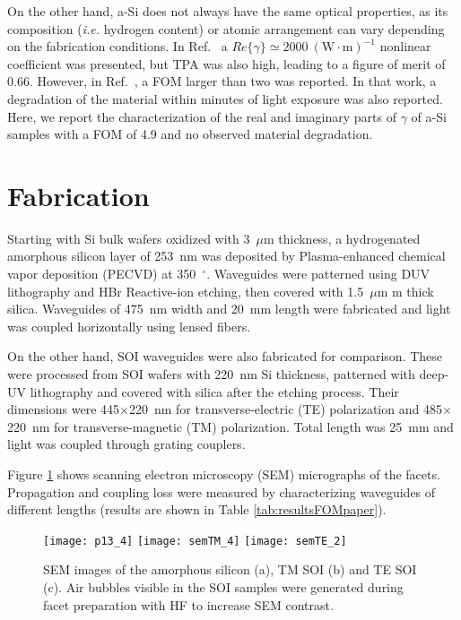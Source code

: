 On the other hand, a-Si does not always have the same optical properties, as its composition (\emph{i.e.} hydrogen content) or atomic arrangement can vary depending on the fabrication conditions.
In Ref.~\cite{Narayanan2010} a $Re\{\gamma\} \simeq 2000~(\mathrm{W}\cdot\mathrm{m})^{-1}$ nonlinear coefficient was presented, but TPA was also high, leading to a figure of merit of 0.66. However, in Ref.~\cite{Kuyken2011}, a FOM larger than two was reported. In that work, a degradation of the material within minutes of light exposure was also reported.
Here, we report the characterization of the real and imaginary parts of $\gamma$ of a-Si samples with a FOM of 4.9 and no observed material degradation.


\section{Fabrication}
Starting with Si bulk wafers oxidized with 3~$\mu \mathrm{m}$ thickness, a hydrogenated amorphous silicon layer of 253~nm was deposited by Plasma-enhanced chemical vapor deposition (PECVD) at 350~$^\circ$. Waveguides were patterned using DUV lithography and HBr Reactive-ion etching, then covered with 1.5~$\mu \mathrm{m}$ m thick silica. Waveguides of 475~nm width and 20~mm length were fabricated and light was coupled horizontally using lensed fibers.

On the other hand, SOI waveguides were also fabricated for comparison. These were processed from SOI wafers with 220~nm Si thickness, patterned with deep-UV lithography and covered with silica after the etching process. Their dimensions were  445$\times$220~nm  for transverse-electric (TE) polarization and 485$\times$220~nm for transverse-magnetic (TM) polarization. Total length was 25~mm and light was coupled through grating couplers.

Figure \ref{fig:sem} shows scanning electron microscopy (SEM) micrographs of the facets. Propagation and coupling loss were measured by characterizing waveguides of different lengths (results are shown in Table \ref{tab:resultsFOMpaper}). 



\begin{figure}[htb]
    \centering
    \texttt{[image: p13\_4]}
    \texttt{[image: semTM\_4]}
    \texttt{[image: semTE\_2]}
    \caption{SEM images of the amorphous silicon (a), TM SOI (b) and TE SOI (c). Air bubbles visible in the SOI samples were generated during facet preparation with HF to increase SEM contrast.}
    \label{fig:sem}
\end{figure}



